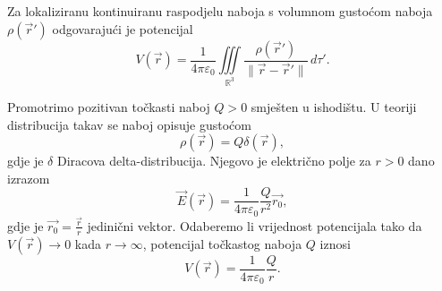 \documentclass[12pt,a4paper]{article}
\begin{document}
Za lokaliziranu kontinuiranu raspodjelu naboja s volumnom gustoćom naboja
$\rho(\overrightarrow{r}')$ odgovarajući je potencijal
$$
V(\overrightarrow{r})
=
\frac{1}{4\pi\varepsilon_0}
\iiint\limits_{\mathbb{R}^3}
\frac{\rho(\overrightarrow{r}')}
{\|\overrightarrow{r}-\overrightarrow{r}'\|}
\,d\tau'.
$$

Promotrimo pozitivan točkasti naboj $Q>0$ smješten u ishodištu. U teoriji distribucija takav se naboj opisuje gustoćom
\[
\rho(\overrightarrow{r}) = Q\delta(\overrightarrow{r}),
\]
gdje je $\delta$ Diracova delta-distribucija. Njegovo je električno
polje za $r>0$ dano izrazom
$$
\overrightarrow{E}(\overrightarrow{r})
=
\frac{1}{4\pi\varepsilon_0}
\frac{Q}{r^2}\overrightarrow{r_0},
$$
gdje je $\overrightarrow{r_0}=\displaystyle \frac{\overrightarrow{r}}{r}$ jedinični vektor. Odaberemo li vrijednost potencijala tako da $V(\overrightarrow{r}) \to 0$ kada $r \to \infty$, potencijal
točkastog naboja $Q$ iznosi
$$
V(\overrightarrow{r})
=
\frac{1}{4\pi\varepsilon_0}\frac{Q}{r}.
$$
\end{document}
